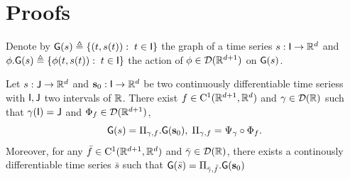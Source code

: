 





\section{Proofs}
\label{appendix:proofs}
Denote by $\mathsf{G}(s)\triangleq \{ (t,s(t)): \; t\in \mathsf{I} \} $ the graph of a time series $s: \mathsf{I} \to \mathbb{R}^d$ and $ \phi.\mathsf{G}(s)\triangleq\{ \phi(t,s(t)): \; t\in \mathsf{I}\} $ the action of  $\phi\in \mathcal{D}(\mathbb{R}^{d+1}) $ on $\mathsf{G}(s)$.
\begin{theorem}
    \label{theorem:representation_proof}
Let $s:  \mathsf{J} \to \mathbb{R}^d  $ and $\mathbf{s}_0: \mathsf{I}\to \mathbb{R}^d $ be two continuously differentiable time seriess with $\mathsf{I},\mathsf{J}$ two intervals of $\mathbb{R}$.
 There exist $f\in \mathrm{C}^1(\mathbb{R}^{d+1},\mathbb{R}^d)$ and $\gamma\in  \mathcal{D}(\mathbb{R}) $ such that $\gamma(\mathsf{I})=\mathsf{J} $ and $\Phi_f\in \mathcal{D}(\mathbb{R}^{d+1})$,
 \begin{equation}%
    \msg(s)= \Pi_{\gamma,f}.\msg(\mathbf{s}_0),\eqsp \Pi_{\gamma,f}=\Psi_\gamma\circ\Phi_f.
 \end{equation}
 Moreover, for any $\bar{f}\in \mathrm{C}^1(\mathbb{R}^{d+1},\mathbb{R}^d)$ and $\bar{\gamma}\in  \mathcal{D}(\mathbb{R}) $, there exists a continously differentiable time series $\bar{s}$ such that 
 $\mathsf{G}(\bar{s})= \Pi_{\bar{\gamma},\bar{f}}.\mathsf{G}(\mathbf{s}_0)$
\end{theorem}
